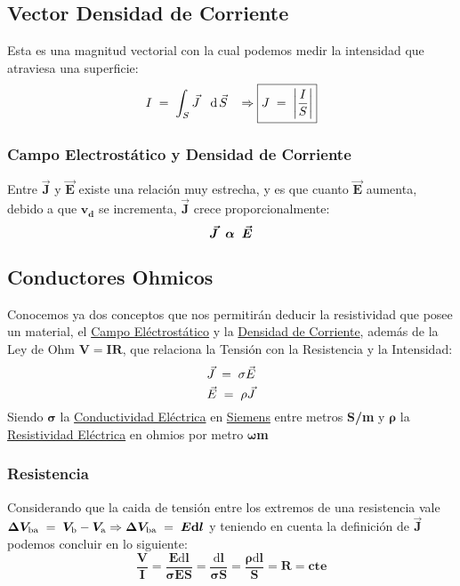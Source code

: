 \subsection{Vector Densidad de Corriente}
\noindent Esta es una magnitud vectorial con la cual podemos medir la intensidad que atraviesa una superficie:
\[
        I \hspace{1mm} = \hspace{1mm} \int_{S} \vec{J}\hspace{3mm}\mathrm{d}\hspace{.5mm}\vec{S}\hspace{3mm}\Rightarrow  \boxed{J\hspace{1mm} = \hspace{1mm} \left | \frac{I}{S} \right |}
\]
\subsubsection{Campo Electrostático y Densidad de Corriente}
\noindent Entre \(\bm{\vec{J}}\) y \(\bm{\vec{E}}\) existe una relación muy estrecha, y es que cuanto \(\bm{\vec{E}}\) aumenta, debido a que \(\bm{v_d}\) se incrementa, \(\bm{\vec{J}}\) crece proporcionalmente:
\[
        \bm{\vec{J}} \hspace{2mm} \bm{\alpha} \hspace{2mm} \bm{\vec{E}}
\]
\subsection{Conductores Ohmicos}
\noindent Conocemos ya dos conceptos que nos permitirán deducir la resistividad que posee un material, el \underline{Campo Eléctrostático} y la \underline{Densidad de Corriente}, además de la Ley de Ohm \(\bm{V = IR}\), que relaciona la Tensión con la Resistencia y la Intensidad:
\[
        \vec{J} \hspace{1mm} = \hspace{1mm} \sigma \vec{E}
\]
\[
        \vec{E} \hspace{1mm} = \hspace{1mm} \rho \vec{J}
\]
Siendo \(\bm{\sigma}\) la \underline{Conductividad Eléctrica} en \underline{Siemens} entre metros \textbf{S/m} y \(\bm{\rho}\) la \underline{Resistividad Eléctrica} en ohmios por metro \(\bm{\omega}\)\textbf{m}
\subsubsection{Resistencia}
\noindent Considerando que la caida de tensión entre los extremos de una resistencia vale \\ \(\bm{\Delta V_{\textnormal{ba}}} \hspace{1mm}= \hspace{1mm} \bm{V_\textnormal{b}} -\bm{V_\textnormal{a}}  \Rightarrow \bm{\Delta V_{\textnormal{ba}}}\hspace{1mm}= \hspace{1mm} \bm{E \mathrm{d}l}\) y teniendo en cuenta la definición de \(\bm{\vec{J}}\) podemos concluir en lo siguiente:
\[
        \boxed{\bm{\frac{V}{I} = \frac{E\mathrm{d}l}{\sigma E S} = \frac{\mathrm{d}l}{\sigma S} = \frac{\rho \mathrm{d}l}{S} = R = cte}}
\]
